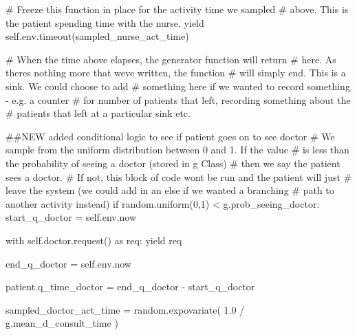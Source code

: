 \documentclass[
  letterpaper,
  DIV=11,
  numbers=noendperiod]{scrreprt}
\newenvironment{Shaded}{\begin{snugshade}}{\end{snugshade}}
\newcommand{\CommentTok}[1]{\textcolor[rgb]{0.37,0.37,0.37}{#1}}
\newcommand{\ControlFlowTok}[1]{\textcolor[rgb]{0.00,0.23,0.31}{#1}}
\newcommand{\DecValTok}[1]{\textcolor[rgb]{0.68,0.00,0.00}{#1}}
\newcommand{\FloatTok}[1]{\textcolor[rgb]{0.68,0.00,0.00}{#1}}
\newcommand{\ImportTok}[1]{\textcolor[rgb]{0.00,0.46,0.62}{#1}}
\newcommand{\NormalTok}[1]{\textcolor[rgb]{0.00,0.23,0.31}{#1}}
\newcommand{\OperatorTok}[1]{\textcolor[rgb]{0.37,0.37,0.37}{#1}}
\newcommand{\VariableTok}[1]{\textcolor[rgb]{0.07,0.07,0.07}{#1}}
\begin{document}
\begin{tcolorbox}
\begin{Shaded}
\begin{Highlighting}[]
            \CommentTok{\# Freeze this function in place for the activity time we sampled}
            \CommentTok{\# above.  This is the patient spending time with the nurse.}
            \ControlFlowTok{yield} \VariableTok{self}\NormalTok{.env.timeout(sampled\_nurse\_act\_time)}

            \CommentTok{\# When the time above elapses, the generator function will return}
            \CommentTok{\# here.  As there\textquotesingle{}s nothing more that we\textquotesingle{}ve written, the function}
            \CommentTok{\# will simply end.  This is a sink.  We could choose to add}
            \CommentTok{\# something here if we wanted to record something {-} e.g. a counter}
            \CommentTok{\# for number of patients that left, recording something about the}
            \CommentTok{\# patients that left at a particular sink etc.}

        \CommentTok{\#\#NEW added conditional logic to see if patient goes on to see doctor}
        \CommentTok{\# We sample from the uniform distribution between 0 and 1.  If the value}
        \CommentTok{\# is less than the probability of seeing a doctor (stored in g Class)}
        \CommentTok{\# then we say the patient sees a doctor.}
        \CommentTok{\# If not, this block of code won\textquotesingle{}t be run and the patient will just}
        \CommentTok{\# leave the system (we could add in an else if we wanted a branching}
        \CommentTok{\# path to another activity instead)}
        \ControlFlowTok{if}\NormalTok{ random.uniform(}\DecValTok{0}\NormalTok{,}\DecValTok{1}\NormalTok{) }\OperatorTok{\textless{}}\NormalTok{ g.prob\_seeing\_doctor:}
\NormalTok{            start\_q\_doctor }\OperatorTok{=} \VariableTok{self}\NormalTok{.env.now}

            \ControlFlowTok{with} \VariableTok{self}\NormalTok{.doctor.request() }\ImportTok{as}\NormalTok{ req:}
                \ControlFlowTok{yield}\NormalTok{ req}

\NormalTok{                end\_q\_doctor }\OperatorTok{=} \VariableTok{self}\NormalTok{.env.now}

\NormalTok{                patient.q\_time\_doctor }\OperatorTok{=}\NormalTok{ end\_q\_doctor }\OperatorTok{{-}}\NormalTok{ start\_q\_doctor}

\NormalTok{                sampled\_doctor\_act\_time }\OperatorTok{=}\NormalTok{ random.expovariate(}
                    \FloatTok{1.0} \OperatorTok{/}\NormalTok{ g.mean\_d\_consult\_time}
\NormalTok{                )}


\end{Highlighting}
\end{Shaded}
\end{tcolorbox}
\end{document}
